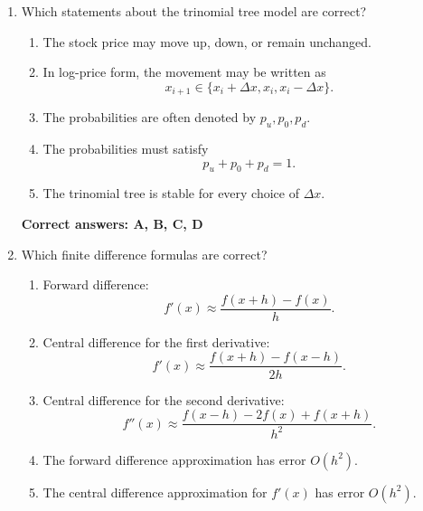 \documentclass[a4paper,12pt]{article}
\begin{document}
\begin{enumerate}
\begin{enumerate}[label=(\arabic*)]
\begin{enumerate}[label=\Alph*.]
    \item In one time step, the stock price can move to either \(uS_i\) or \(dS_i\).
    \item The no-arbitrage condition is
    \[
    d<e^{r\Delta t}<u.
    \]
    \item The risk-neutral probability is
    \[
    q=\frac{e^{r\Delta t}-d}{u-d}.
    \]
    \item The real-world probability \(p\) must be used directly for derivative pricing.
    \item The derivative value can be computed by backward induction.
\end{enumerate}

\textbf{Correct answers: A, B, C, E}
\item Which statements about the trinomial tree model are correct?

\begin{enumerate}[label=\Alph*.]
    \item The stock price may move up, down, or remain unchanged.
    \item In log-price form, the movement may be written as
    \[
    x_{i+1}\in\{x_i+\Delta x,x_i,x_i-\Delta x\}.
    \]
    \item The probabilities are often denoted by \(p_u,p_0,p_d\).
    \item The probabilities must satisfy
    \[
    p_u+p_0+p_d=1.
    \]
    \item The trinomial tree is stable for every choice of \(\Delta x\).
\end{enumerate}

\textbf{Correct answers: A, B, C, D}
\item Which finite difference formulas are correct?

\begin{enumerate}[label=\Alph*.]
    \item Forward difference:
    \[
    f'(x)\approx \frac{f(x+h)-f(x)}{h}.
    \]
    \item Central difference for the first derivative:
    \[
    f'(x)\approx \frac{f(x+h)-f(x-h)}{2h}.
    \]
    \item Central difference for the second derivative:
    \[
    f''(x)\approx \frac{f(x-h)-2f(x)+f(x+h)}{h^2}.
    \]
    \item The forward difference approximation has error \(O(h^2)\).
    \item The central difference approximation for \(f'(x)\) has error \(O(h^2)\).
\end{enumerate}


\end{enumerate}
\end{enumerate}
\end{document}
